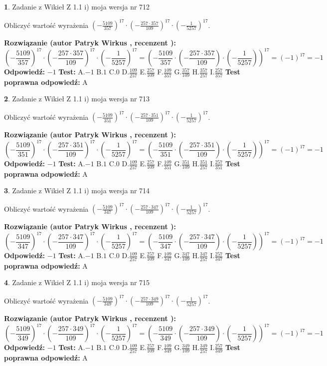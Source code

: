 \documentclass[12pt, a4paper]{article}
\theoremstyle{definition} %
\newtheorem{zad}{}
\newcommand{\zadStart}[1]{\begin{zad}#1\newline}
\newcommand{\zadStop}{\end{zad}}
\newcommand{\rozwStart}[2]{\noindent \textbf{Rozwiązanie (autor #1 , recenzent #2): }\newline}
\newcommand{\rozwStop}{\newline}
\newcommand{\odpStart}{\noindent \textbf{Odpowiedź:}\newline}
\newcommand{\odpStop}{\newline}
\newcommand{\testStart}{\noindent \textbf{Test:}\newline}
\newcommand{\testStop}{\newline}
\newcommand{\kluczStart}{\noindent \textbf{Test poprawna odpowiedź:}\newline}
\newcommand{\kluczStop}{\newline}
\begin{document}
\zadStart{Zadanie z Wikieł Z 1.1 i) moja wersja nr 712}

Obliczyć wartość wyrażenia $(-\frac{5109}{357})^{17} \cdot (-\frac{257 \cdot 357}{109})^{17} \cdot (-\frac{1}{5257})^{17}$.
\zadStop
\rozwStart{Patryk Wirkus}{}
$$(-\frac{5109}{357})^{17} \cdot (-\frac{257 \cdot 357}{109})^{17} \cdot (-\frac{1}{5257})^{17} = (-\frac{5109}{357} \cdot (-\frac{257 \cdot 357}{109}) \cdot (-\frac{1}{5257}))^{17} = (-1)^{17} = -1$$
\rozwStop
\odpStart
$-1$
\odpStop
\testStart
A.$-1$ B.$1$ C.$0$ D.$\frac{109}{257}$ E.$\frac{257}{109}$
F.$\frac{109}{357}$ G.$\frac{357}{109}$
H.$\frac{357}{257}$
I.$\frac{257}{357}$
\testStop
\kluczStart
A
\kluczStop



\zadStart{Zadanie z Wikieł Z 1.1 i) moja wersja nr 713}

Obliczyć wartość wyrażenia $(-\frac{5109}{351})^{17} \cdot (-\frac{257 \cdot 351}{109})^{17} \cdot (-\frac{1}{5257})^{17}$.
\zadStop
\rozwStart{Patryk Wirkus}{}
$$(-\frac{5109}{351})^{17} \cdot (-\frac{257 \cdot 351}{109})^{17} \cdot (-\frac{1}{5257})^{17} = (-\frac{5109}{351} \cdot (-\frac{257 \cdot 351}{109}) \cdot (-\frac{1}{5257}))^{17} = (-1)^{17} = -1$$
\rozwStop
\odpStart
$-1$
\odpStop
\testStart
A.$-1$ B.$1$ C.$0$ D.$\frac{109}{257}$ E.$\frac{257}{109}$
F.$\frac{109}{351}$ G.$\frac{351}{109}$
H.$\frac{351}{257}$
I.$\frac{257}{351}$
\testStop
\kluczStart
A
\kluczStop



\zadStart{Zadanie z Wikieł Z 1.1 i) moja wersja nr 714}

Obliczyć wartość wyrażenia $(-\frac{5109}{347})^{17} \cdot (-\frac{257 \cdot 347}{109})^{17} \cdot (-\frac{1}{5257})^{17}$.
\zadStop
\rozwStart{Patryk Wirkus}{}
$$(-\frac{5109}{347})^{17} \cdot (-\frac{257 \cdot 347}{109})^{17} \cdot (-\frac{1}{5257})^{17} = (-\frac{5109}{347} \cdot (-\frac{257 \cdot 347}{109}) \cdot (-\frac{1}{5257}))^{17} = (-1)^{17} = -1$$
\rozwStop
\odpStart
$-1$
\odpStop
\testStart
A.$-1$ B.$1$ C.$0$ D.$\frac{109}{257}$ E.$\frac{257}{109}$
F.$\frac{109}{347}$ G.$\frac{347}{109}$
H.$\frac{347}{257}$
I.$\frac{257}{347}$
\testStop
\kluczStart
A
\kluczStop



\zadStart{Zadanie z Wikieł Z 1.1 i) moja wersja nr 715}

Obliczyć wartość wyrażenia $(-\frac{5109}{349})^{17} \cdot (-\frac{257 \cdot 349}{109})^{17} \cdot (-\frac{1}{5257})^{17}$.
\zadStop
\rozwStart{Patryk Wirkus}{}
$$(-\frac{5109}{349})^{17} \cdot (-\frac{257 \cdot 349}{109})^{17} \cdot (-\frac{1}{5257})^{17} = (-\frac{5109}{349} \cdot (-\frac{257 \cdot 349}{109}) \cdot (-\frac{1}{5257}))^{17} = (-1)^{17} = -1$$
\rozwStop
\odpStart
$-1$
\odpStop
\testStart
A.$-1$ B.$1$ C.$0$ D.$\frac{109}{257}$ E.$\frac{257}{109}$
F.$\frac{109}{349}$ G.$\frac{349}{109}$
H.$\frac{349}{257}$
I.$\frac{257}{349}$
\testStop
\kluczStart
A
\kluczStop
\end{document}
